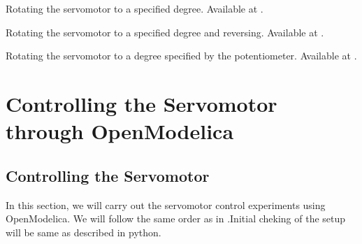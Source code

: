 \begin{juliacode}
   {Rotating
    the servomotor to a specified degree.  Available at
    .}
  \label{julia:servo-init}
  
\end{juliacode}

\begin{juliacode}
   {Rotating 
    the servomotor to a specified degree and reversing.  Available at
    .}
  \label{julia:servo-reverse}
  
\end{juliacode}

\begin{juliacode}
  \label{julia:servo-loop}
  
\end{juliacode}

\begin{juliacode}
   {Rotating the servomotor to a degree specified by
    the potentiometer.  Available at .}
  \label{julia:servo-pot}
  
\end{juliacode}

\section{Controlling the Servomotor through OpenModelica}
\subsection{Controlling the Servomotor}
\label{sec:servo-OpenModelica}
In this section, we will carry out the servomotor control experiments
using OpenModelica.  We will follow the same order as in
.Initial cheking of the setup will be same as
described in python.

